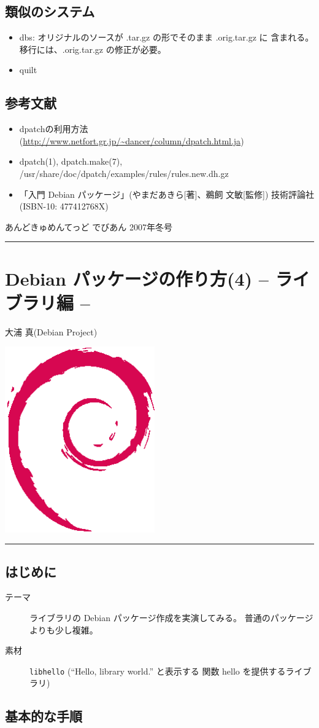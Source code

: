 \documentclass[mingoth,a4paper]{jsarticle}
\renewcommand{\dancersection}[2]{%
\newpage
あんどきゅめんてっど でびあん 2007年冬号
%
\vspace{0.1mm}\\
{\color{dancerlightblue}\rule{\hsize}{2mm}}

%
%
\begin{minipage}[t]{0.7\hsize}
\color{dancerdarkblue}
\vspace{1cm}
\section{#1}
\hfill{}#2\\
\end{minipage}
\begin{minipage}[t]{0.3\hsize}
\vspace{-2cm}
\hfill{}\includegraphics[height=8cm]{image200502/openlogo-nd.eps}\\
\vspace{-5cm}
\end{minipage}
%
%
{\color{dancerdarkblue}\rule{0.74\hsize}{2mm}}
%
\vspace{2cm}
}
\begin{document}
\subsection{類似のシステム}

\begin{itemize}
\item dbs: オリジナルのソースが .tar.gz の形でそのまま .orig.tar.gz に
  含まれる。移行には、.orig.tar.gz の修正が必要。
\item quilt
\end{itemize}

\subsection{参考文献}

\begin{itemize}
\item dpatchの利用方法
  (\url{http://www.netfort.gr.jp/~dancer/column/dpatch.html.ja})
\item dpatch(1), dpatch.make(7),
  /usr/share/doc/dpatch/examples/rules/rules.new.dh.gz
\item 「入門 Debian パッケージ」(やまだあきら[著]、鵜飼 文敏[監修]) 技術評論社
  (ISBN-10: 477412768X)
\end{itemize}


\dancersection{Debian パッケージの作り方(4) -- ライブラリ編 --}{大浦 真(Debian Project)}
\subsection{はじめに}

\begin{description}
\item[テーマ] ライブラリの Debian パッケージ作成を実演してみる。
  普通のパッケージよりも少し複雑。
\item[素材] \texttt{libhello} (``Hello, library world.'' と表示する
  関数 hello を提供するライブラリ)
\end{description}

\subsection{基本的な手順}
\end{document}
